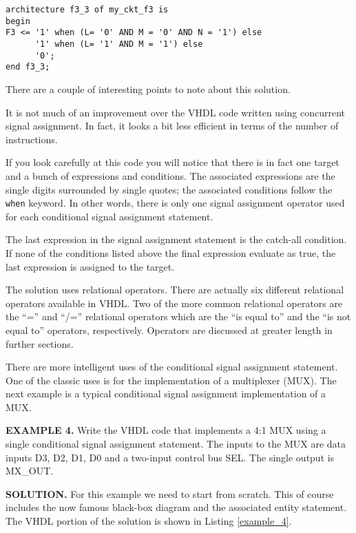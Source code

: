 \noindent
\begin{minipage}{0.99\linewidth}
\begin{lstlisting}[label=example_3, caption=Solution of Example 3.]
architecture f3_3 of my_ckt_f3 is
begin
F3 <= '1' when (L= '0' AND M = '0' AND N = '1') else
      '1' when (L= '1' AND M = '1') else
      '0';
end f3_3;
\end{lstlisting}
\end{minipage}

There are a couple of interesting points to note about this solution.
\begin{my_list}
\item It is not much of an improvement over the VHDL code written using concurrent signal assignment. In fact, it looks a bit less efficient in terms of the number of instructions.
\item If you look carefully at this code you will notice that there is in fact one target and a bunch of expressions and conditions. The associated expressions are the single digits surrounded by single quotes; the associated conditions follow the \texttt{when} keyword. In other words, there is only one signal assignment operator used for each conditional signal assignment statement.
\item The last expression in the signal assignment statement is the catch-all condition. If none of the conditions listed above the final expression evaluate as true, the last expression is assigned to the target.
\item The solution uses relational operators. There are actually six different relational operators available in VHDL. Two of the more common relational operators are the ``='' and ``/='' relational operators which are the ``is equal to'' and the ``is not equal to'' operators, respectively. Operators are discussed at greater length in further sections.
\end{my_list}
There are more intelligent uses of the conditional signal assignment statement. One of the classic uses is for the implementation of a multiplexer (MUX). The next example is a typical conditional signal assignment implementation of a MUX.

\begin{leftbar}
\noindent
\textbf{EXAMPLE 4.}
Write the VHDL code that implements a 4:1 MUX using a single conditional signal assignment statement. The inputs to the MUX are data inputs D3, D2, D1, D0 and a two-input control bus SEL. The single output is MX\_OUT.
\end{leftbar}
\noindent
\textbf{SOLUTION.} For this example we need to start from scratch. This of course includes the now famous black-box diagram and the associated entity statement. The VHDL portion of the solution is shown in Listing \ref{example_4}.

